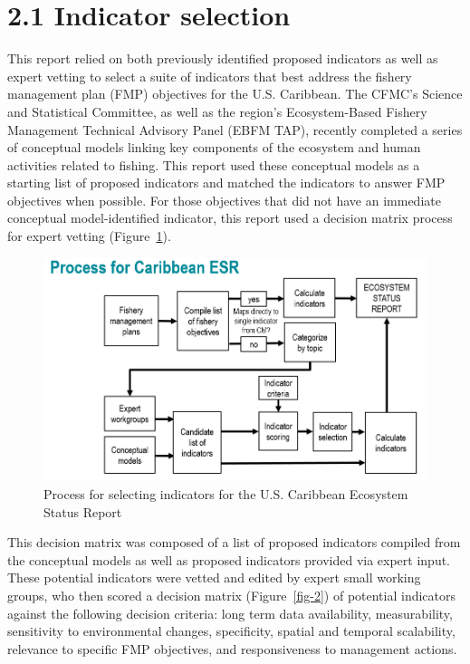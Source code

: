 \documentclass[
  letterpaper,
  oneside,
  open=any]{scrbook}
\begin{document}
\hypertarget{indicator-selection}{%
\section{2.1 Indicator selection}\label{indicator-selection}}

This report relied on both previously identified proposed indicators as
well as expert vetting to select a suite of indicators that best address
the fishery management plan (FMP) objectives for the U.S. Caribbean. The
CFMC's Science and Statistical Committee, as well as the region's
Ecosystem-Based Fishery Management Technical Advisory Panel (EBFM TAP),
recently completed a series of conceptual models linking key components
of the ecosystem and human activities related to fishing. This report
used these conceptual models as a starting list of proposed indicators
and matched the indicators to answer FMP objectives when possible. For
those objectives that did not have an immediate conceptual
model-identified indicator, this report used a decision matrix process
for expert vetting (Figure~\ref{fig-1}).

\begin{figure}

{\centering \includegraphics{Report_book_files/images/process_flow_chart.png}

}

\caption{\label{fig-1}Process for selecting indicators for the U.S.
Caribbean Ecosystem Status Report}

\end{figure}

This decision matrix was composed of a list of proposed indicators
compiled from the conceptual models as well as proposed indicators
provided via expert input. These potential indicators were vetted and
edited by expert small working groups, who then scored a decision matrix
(Figure~\ref{fig-2}) of potential indicators against the following
decision criteria: long term data availability, measurability,
sensitivity to environmental changes, specificity, spatial and temporal
scalability, relevance to specific FMP objectives, and responsiveness to
management actions.
\end{document}
